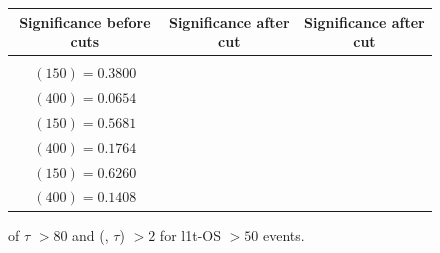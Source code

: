 \documentclass[letterpaper,12pt]{article}
\begin{document}
\begin{figure}[h]
  \vspace{0.6cm}
  \tiny
  \setlength{\tabcolsep}{20pt}
  \renewcommand{\arraystretch}{1.6}
  \begin{tabular}{|c|c|c|}
    \hline
    Significance before cuts & Significance after \pt{} cut & Significance after \DeltaR{} cut\\
    \hline
    \Gape[0.2cm]{\makecell{
        \sig{} $(100) = 0.2990$\\
        \sig{} $(150) = 0.3800$\\
        \sig{} $(400) = 0.0654$ }} & 
    \makecell{
      \sig{} $(100) = 0.2305$\\
      \sig{} $(150) = 0.5681$\\
      \sig{} $(400) = 0.1764$} & 
    \makecell{
      \sig{} $(100) = 0.3032$\\
      \sig{} $(150) = 0.6260$\\
      \sig{} $(400) = 0.1408$}\\
    \hline
  \end{tabular}
  \caption{\pt{} of $\tau$ $>80$ and \DeltaR{} (\ls, $\tau$) $>2$ for \2l1t-OS \metpt $>50$ events.}
  \label{fig:2l1tc4}
\end{figure}
\end{document}
